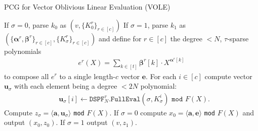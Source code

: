 \begin{specialconstruction}{PCG for Vector Oblivious Linear Evaluation (VOLE)}
\begin{algorithmic}[1]
\State If $\sigma=0$, parse $k_0$ as $(v, \{K_0^{r}\}_{r\in[c]})$
\State If $\sigma=1$, parse $k_1 $ as $(\{\boldsymbol{\alpha}^r, \boldsymbol{\beta}^r\}_{r\in[c]}, \{K_\sigma^{r}\}_{r\in[c]})$ and define for $r \in [c]$ the degree $< N$, $\tau$-sparse polynomials
\begin{align*}
e^r(X) = \sum_{k\in [t]} \boldsymbol{\beta}^r[k] \cdot X^{\boldsymbol{\alpha}^r[k]}
\end{align*}
to compose all $e^r$ to a single length-$c$ vector $\boldsymbol{e}$.
\State For each $i \in [c]$ compute vector $\boldsymbol{u}_\sigma$ with each element being a degree $< 2N$ polynomial:
\begin{align*}
& \boldsymbol{u}_\sigma[i] \leftarrow \texttt{DSPF}^{\tau}_{N}\texttt{.FullEval}(\sigma, K_\sigma^{i}) 
\texttt{ mod } F(X).
\end{align*}
\State Compute $z_\sigma  = \langle\boldsymbol{a},\boldsymbol{u}_\sigma\rangle$ \texttt{mod} $F(X)$.
\State If $\sigma=0$ compute $x_0 = \langle\boldsymbol{a},\boldsymbol{e}\rangle$ \texttt{mod} $F(X)$ and output $(x_0, z_0)$.
\State If $\sigma=1$ output $(v, z_1)$.
\end{algorithmic}
\end{specialconstruction}

\vspace{1em}

